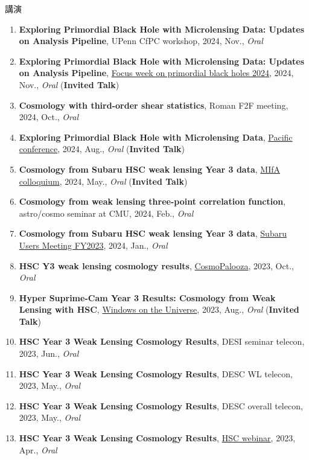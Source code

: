 \begin{rSection}{講演}
\begin{enumerate}
\item \textbf{Exploring Primordial Black Hole with Microlensing Data: Updates on Analysis Pipeline}, UPenn CfPC workshop, 2024, Nov., \textit{Oral}
\item \textbf{Exploring Primordial Black Hole with Microlensing Data: Updates on Analysis Pipeline}, \href{https://indico.ipmu.jp/event/439/overview}{Focus week on primordial black holes 2024}, 2024, Nov., \textit{Oral} (\textbf{Invited Talk})
\item \textbf{Cosmology with third-order shear statistics}, Roman F2F meeting, 2024, Oct., \textit{Oral}
\item \textbf{Exploring Primordial Black Hole with Microlensing Data}, \href{https://pacific-conference.pa.ucla.edu/index.html}{Pacific conference}, 2024, Aug., \textit{Oral} (\textbf{Invited Talk})
\item \textbf{Cosmology from Subaru HSC weak lensing Year 3 data}, \href{https://cse.umn.edu/physics/minnesota-institute-astrophysics-mifa-colloquium}{MIfA colloquium}, 2024, May., \textit{Oral} (\textbf{Invited Talk})
\item \textbf{Cosmology from weak lensing three-point correlation function}, astro/cosmo seminar at CMU, 2024, Feb., \textit{Oral}
\item \textbf{Cosmology from Subaru HSC weak lensing Year 3 data}, \href{https://www.subarutelescope.org/Science/SubaruUM/SubaruUM2023/index.html}{Subaru Users Meeting FY2023}, 2024, Jan., \textit{Oral}
\item \textbf{HSC Y3 weak lensing cosmology results}, \href{http://vietnam.in2p3.fr/2023/windows/index.html}{CosmoPalooza}, 2023, Oct., \textit{Oral}
\item \textbf{Hyper Suprime-Cam Year 3 Results: Cosmology from Weak Lensing with HSC}, \href{http://vietnam.in2p3.fr/2023/windows/index.html}{Windows on the Universe}, 2023, Aug., \textit{Oral} (\textbf{Invited Talk})
\item \textbf{HSC Year 3 Weak Lensing Cosmology Results}, DESI seminar telecon, 2023, Jun., \textit{Oral}
\item \textbf{HSC Year 3 Weak Lensing Cosmology Results}, DESC WL telecon, 2023, May., \textit{Oral}
\item \textbf{HSC Year 3 Weak Lensing Cosmology Results}, DESC overall telecon, 2023, May., \textit{Oral}
\item \textbf{HSC Year 3 Weak Lensing Cosmology Results}, \href{https://hsc-release.mtk.nao.ac.jp/doc/index.php/wly3/}{HSC webinar}, 2023, Apr., \textit{Oral}

\end{enumerate}
\end{rSection}
